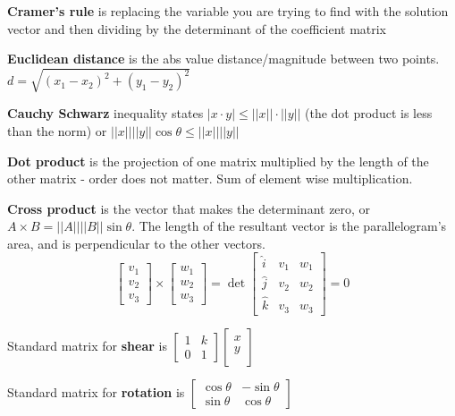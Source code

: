 \documentclass[11pt, letterpaper, twoside]{article}
\begin{document}
\vspace{2mm}
\textbf{Cramer's rule} is replacing the variable you are trying to find with the solution vector and then dividing by the determinant of the coefficient matrix

\vspace{2mm}
\textbf{Euclidean distance} is the abs value distance/magnitude between two points. \(d=\sqrt{(x_1-x_2)^2+(y_1-y_2)^2}\)

\vspace{2mm}
\textbf{Cauchy Schwarz} inequality states \(|x\cdot y|\leq ||x||\cdot||y||\) (the dot product is less than the norm) or \(||x||||y||\cos\theta\leq||x||||y||\)

\vspace{2mm}
\textbf{Dot product} is the projection of one matrix multiplied by the length of the other matrix - order does not matter. Sum of element wise multiplication.

\vspace{2mm}
\textbf{Cross product} is the vector that makes the determinant zero, or \(A\times B= ||A||||B||\sin\theta\). 
The length of the resultant vector is the parallelogram's area, and is perpendicular to the other vectors.
\[\begin{bmatrix}
    v_1\\
    v_2\\
    v_3
\end{bmatrix}\times\begin{bmatrix}
    w_1\\
    w_2\\
    w_3
\end{bmatrix}=\det \begin{bmatrix}
    \hat{i}&v_1&w_1\\
    \hat{j}&v_2&w_2\\
    \hat{k}&v_3&w_3
\end{bmatrix}=0\]

\vspace{2mm}
Standard matrix for \textbf{shear} is \(\begin{bmatrix}
    1&k\\
    0&1
\end{bmatrix}\begin{bmatrix}
    x\\
    y\\
\end{bmatrix}\)

\vspace{2mm}
Standard matrix for \textbf{rotation} is \(\begin{bmatrix}
    \cos\theta&-\sin\theta\\
    \sin\theta&\cos\theta
\end{bmatrix}\)
\end{document}
